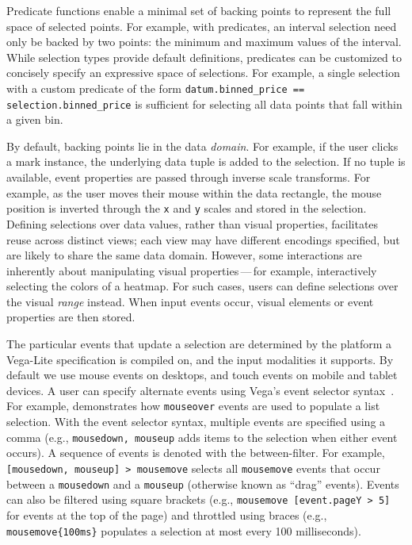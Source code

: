 Predicate functions enable a minimal set of backing points to represent the full
space of selected points. For example, with predicates, an interval selection
need only be backed by two points: the minimum and maximum values of the
interval. While selection types provide default definitions, predicates can be
customized to concisely specify an expressive space of selections. For example,
a single selection with a custom predicate of the form
\texttt{datum.binned\_price == selection.binned\_price} is sufficient for
selecting all data points that fall within a given bin.

By default, backing points lie in the data \emph{domain}. For example, if the
user clicks a mark instance, the underlying data tuple is added to the
selection. If no tuple is available, event properties are passed through inverse
scale transforms. For example, as the user moves their mouse within the data
rectangle, the mouse position is inverted through the \texttt{x} and \texttt{y}
scales and stored in the selection. Defining selections over data values, rather
than visual properties, facilitates reuse across distinct views; each view may
have different encodings specified, but are likely to share the same data
domain. However, some interactions are inherently about manipulating visual
properties\,---\,for example, interactively selecting the colors of a heatmap.
For such cases, users can define selections over the visual \emph{range}
instead. When input events occur, visual elements or event properties are then
stored.

The particular events that update a selection are determined by the platform a
Vega-Lite specification is compiled on, and the input modalities it
supports. By default we use mouse events on desktops, and touch events on mobile
and tablet devices. A user can specify alternate events using Vega's event
selector syntax~\cite{reactive-vega-model}. For example,
 demonstrates how \texttt{mouseover} events are used to
populate a list selection. With the event selector syntax, multiple events are
specified using a comma (e.g., \texttt{mousedown, mouseup} adds items to the
selection when either event occurs). A sequence of events is denoted with the
between-filter. For example, \texttt{[mousedown, mouseup] > mousemove} selects
all \texttt{mousemove} events that occur between a \texttt{mousedown} and a
\texttt{mouseup} (otherwise known as ``drag'' events). Events can also be
filtered using square brackets (e.g., \texttt{mousemove [event.pageY > 5]} for
events at the top of the page) and throttled using braces (e.g.,
\texttt{mousemove\{100ms\}} populates a selection at most every 100
milliseconds).


